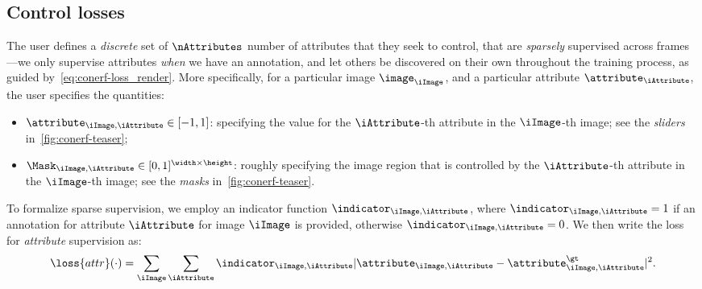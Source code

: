   \subsection{Control losses}
    \label{sec:conerf-control}
    The user defines a \textit{discrete} set of $\nAttributes$ number of
    attributes that they seek to control, that are \textit{sparsely} supervised
    across frames---we only supervise attributes \textit{when} we have an
    annotation, and let others be discovered on their own throughout the training
    process, as guided by~\cref{eq:conerf-loss_render}.
    More specifically, for a particular image $\image_\iImage$, and a particular attribute $\attribute_\iAttribute$, the user specifies the quantities:
    \begin{itemize}
      \item $\attribute_{\iImage, \iAttribute} \in [-1,1]$: specifying the value for the $\iAttribute$-th attribute in the $\iImage$-th image; see the \textit{sliders} in~\cref{fig:conerf-teaser};
      \item $\Mask_{\iImage, \iAttribute} \in [0,1]^{\width \times \height}$: roughly specifying the image region that is controlled by the $\iAttribute$-th attribute in the $\iImage$-th image; see the \textit{masks} in~\cref{fig:conerf-teaser}.
    \end{itemize}
    To formalize sparse supervision, we employ an indicator function
    $\indicator_{\iImage, \iAttribute}$, where $\indicator_{\iImage,
        \iAttribute}=1$ if an annotation for attribute $\iAttribute$ for image
    $\iImage$ is provided, otherwise $\indicator_{\iImage, \iAttribute}=0$.
    We then write the loss for \textit{attribute} supervision as:
    \begin{equation}
      \loss{attr}(\cdot) =
      \sum_\iImage \sum_\iAttribute
      \indicator_{\iImage, \iAttribute}
      |\attribute_{\iImage,\iAttribute} - \attribute^\gt_{\iImage,\iAttribute}|^2
      .
    \end{equation}

